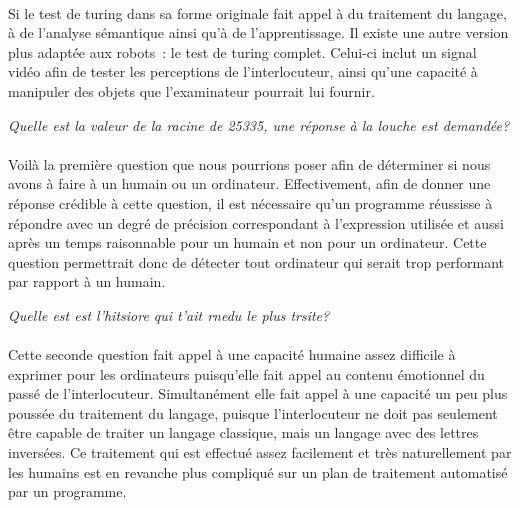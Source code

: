 \paragraph{}
Si le test de turing dans sa forme originale fait appel à du traitement du
langage, à de l'analyse sémantique ainsi qu'à de l'apprentissage. Il existe une
autre version plus adaptée aux robots~: le test de turing complet. Celui-ci
inclut un signal vidéo afin de tester les perceptions de l'interlocuteur, ainsi
qu'une capacité à manipuler des objets que l'examinateur pourrait lui fournir.

\begin{centering}
  {\em Quelle est la valeur de la racine de 25335, une réponse à la louche est
    demandée?}
\end{centering}

\paragraph{}
Voilà la première question que nous pourrions poser afin de déterminer si nous
avons à faire à un humain ou un ordinateur. Effectivement, afin de donner une
réponse crédible à cette question, il est nécessaire qu'un programme réussisse
à répondre avec un degré de précision correspondant à l'expression utilisée et
aussi après un temps raisonnable pour un humain et non pour un ordinateur. Cette
question permettrait donc de détecter tout ordinateur qui serait trop performant
par rapport à un humain.

\begin{centering}
  {\em Quelle est est l'hitsiore qui t'ait rnedu le plus trsite?}
\end{centering}

\paragraph{}
Cette seconde question fait appel à une capacité humaine assez difficile à
exprimer pour les ordinateurs puisqu'elle fait appel au contenu émotionnel du
passé de l'interlocuteur. Simultanément elle fait appel à une capacité un peu
plus poussée du traitement du langage, puisque l'interlocuteur ne doit pas
seulement être capable de traiter un langage classique, mais un langage avec des
lettres inversées. Ce traitement qui est effectué assez facilement et très
naturellement par les humains est en revanche plus compliqué sur un plan
de traitement automatisé par un programme.

